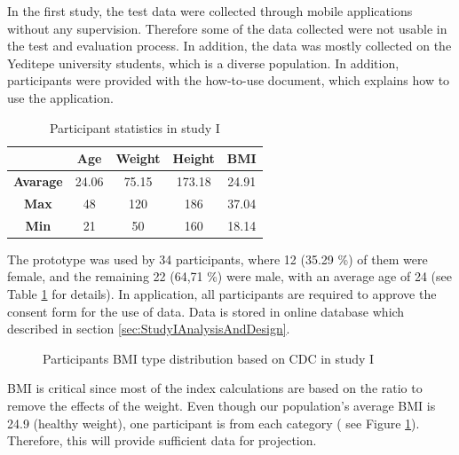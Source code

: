 In the first study, the test data were collected through mobile applications without any supervision. Therefore some of the data collected were not usable in the test and evaluation process. In addition, the data was mostly collected on the Yeditepe university students, which is a diverse population. In addition, participants were provided with the how-to-use document, which explains how to use the application. 

\begin{table}[htbp]
\begin{center}
\caption{Participant statistics in study I}
\vspace{23pt}
      \begin{tabular}{|c|c|c|c|c|} \hline
          & \textbf{Age} & \textbf{Weight} & \textbf{Height} & \textbf{BMI} \\ \hline
        \textbf{Avarage} & 24.06 & 75.15 & 173.18 & 24.91 \\ \hline
        \textbf{Max} & 48 & 120 & 186 & 37.04 \\ \hline
        \textbf{Min} & 21 & 50 & 160 & 18.14 \\ \hline
    \end{tabular}
\label{tab:StudyIParticipantStatistics}
\end{center}
\end{table}

The prototype was used by 34 participants, where 12 (35.29 \%) of them were female, and the remaining 22 (64,71 \%) were male, with an average age of 24 (see Table \ref{tab:StudyIParticipantStatistics} for details). In application, all participants are required to approve the consent form for the use of data. Data is stored in online database which described in section \ref{sec:StudyIAnalysisAndDesign}. 

\begin{figure}[htbp]
\centering
{}
\caption{Participants BMI type distribution based on CDC in study I}
\label{fig:StudyIParticipantsBMITypeDistribution}
\end{figure}

BMI is critical since most of the index calculations are based on the ratio to remove the effects of the weight. Even though our population's average BMI is 24.9 (healthy weight), one participant is from each category ( see Figure \ref{fig:StudyIParticipantsBMITypeDistribution}). Therefore, this will provide sufficient data for projection.

